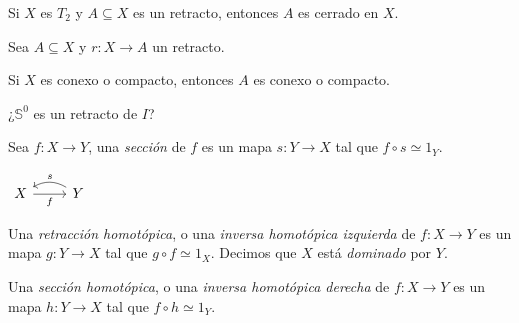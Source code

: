 \begin{tcolorbox}[colback=blue!5!white,colframe=blue!75!blue,title=\textbf{Proposición}.]
    Si \(X\) es \(T_2\) y \(A\subseteq X\) es un retracto, entonces \(A\) es cerrado en \(X\).
\end{tcolorbox}

\begin{tcolorbox}[colback=antiquefuchsia!15!white,colframe=antiquefuchsia!75!black,title=\textbf{Observación}]
    Sea \(A\subseteq X\) y \(r\colon X\to A\) un retracto. 
    
    Si \(X\) es conexo o compacto, entonces \(A\) es conexo o compacto.
\end{tcolorbox}

\begin{tcolorbox}[colback=white!15!white,colframe=green!55!black,title=\textbf{Pregunta}]
    \begin{center}
        ¿\(\mathbb{S}^0\) es un retracto de \(I\)?
    \end{center}
\end{tcolorbox}

\begin{tcolorbox}[colback=blue-violet!5!white,colframe=blue-violet!75!black,title=\textbf{Definición}.\index{sección}]
    Sea \(f\colon X\to Y\), una \textit{sección} de \(f\) es un mapa \(s\colon Y\to X\) tal que \(f\circ s\simeq 1_{Y}\).
\tcblower
    \begin{center}  
    \(\begin{tikzcd}
        X \arrow[r, right, swap]{}{f}
        & Y \arrow[l, bend right, swap]{}{s}
    \end{tikzcd}\)
    \end{center}
\end{tcolorbox}

\begin{tcolorbox}[colback=blue-violet!5!white,colframe=blue-violet!75!black,title=\textbf{Definición}.\index{retracción homotópica}\index{inversa homotópica izquierda}]
    Una \textit{retracción homotópica}, o una \textit{inversa homotópica izquierda} de \(f\colon X\to Y\)
    es un mapa \(g\colon Y\to X\) tal que \(g\circ f\simeq 1_{X}\). 
    \tcblower
    Decimos que \(X\) está \textit{dominado} por \(Y\).
\end{tcolorbox}

\begin{tcolorbox}[colback=blue-violet!5!white,colframe=blue-violet!75!black,title=\textbf{Definición}.\index{sección homotópica}\index{inversa homotópica derecha}]
    Una \textit{sección homotópica}, o una \textit{inversa homotópica derecha} de \(f\colon X\to Y\)   
    es un mapa \(h\colon Y\to X\) tal que \(f\circ h\simeq 1_{Y}\). 
\end{tcolorbox}

